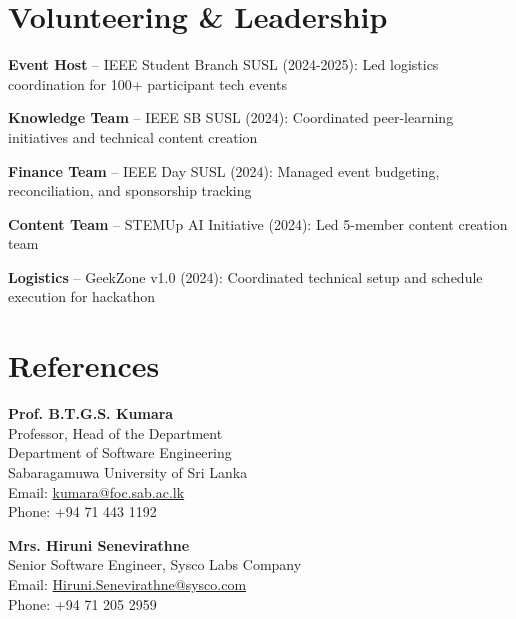 \documentclass[letterpaper,10pt]{article}
\newenvironment{resume_list}{
  \vspace{-2pt}
  \begin{itemize}[itemsep=1pt, leftmargin=14pt]
}{
  \end{itemize}\vspace{-3pt}
}
\begin{document}
\section{Volunteering \& Leadership}
\vspace{-1pt}
\begin{resume_list}
  \item \textbf{Event Host} – IEEE Student Branch SUSL (2024-2025): Led logistics coordination for 100+ participant tech events
  \item \textbf{Knowledge Team} – IEEE SB SUSL (2024): Coordinated peer-learning initiatives and technical content creation
  \item \textbf{Finance Team} – IEEE Day SUSL (2024): Managed event budgeting, reconciliation, and sponsorship tracking
  \item \textbf{Content Team} – STEMUp AI Initiative (2024): Led 5-member content creation team
  \item \textbf{Logistics} – GeekZone v1.0 (2024): Coordinated technical setup and schedule execution for hackathon
\end{resume_list}

\vspace{-2pt}
\section{References}
\vspace{-1pt}

\textbf{Prof. B.T.G.S. Kumara}\\
Professor, Head of the Department\\
Department of Software Engineering\\
Sabaragamuwa University of Sri Lanka\\
Email: \href{mailto:kumara@foc.sab.ac.lk}{kumara@foc.sab.ac.lk}\\
Phone: +94 71 443 1192

\vspace{3pt}
\textbf{Mrs. Hiruni Senevirathne}\\
Senior Software Engineer, Sysco Labs Company\\
Email: \href{mailto:Hiruni.Senevirathne@sysco.com}{Hiruni.Senevirathne@sysco.com}\\
Phone: +94 71 205 2959
\end{document}
